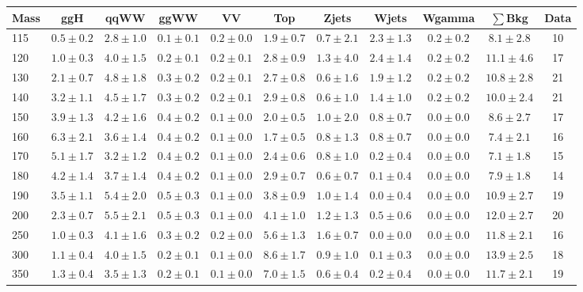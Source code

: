 \begin{table}
{\scriptsize
 \begin{center}
 \begin{tabular}{l c c c c c c c c c c }
 \hline
 Mass & ggH & qqWW & ggWW & VV & Top & Zjets & Wjets & Wgamma & $\sum$Bkg & Data \\
 \hline
115 & $0.5\pm0.2$ & $2.8\pm1.0$ & $0.1\pm0.1$ & $0.2\pm0.0$ & $1.9\pm0.7$ & $0.7\pm2.1$ & $2.3\pm1.3$ & $0.2\pm0.2$ & $8.1\pm2.8$ & 10 \\
120 & $1.0\pm0.3$ & $4.0\pm1.5$ & $0.2\pm0.1$ & $0.2\pm0.1$ & $2.8\pm0.9$ & $1.3\pm4.0$ & $2.4\pm1.4$ & $0.2\pm0.2$ & $11.1\pm4.6$ & 17 \\
130 & $2.1\pm0.7$ & $4.8\pm1.8$ & $0.3\pm0.2$ & $0.2\pm0.1$ & $2.7\pm0.8$ & $0.6\pm1.6$ & $1.9\pm1.2$ & $0.2\pm0.2$ & $10.8\pm2.8$ & 21 \\
140 & $3.2\pm1.1$ & $4.5\pm1.7$ & $0.3\pm0.2$ & $0.2\pm0.1$ & $2.9\pm0.8$ & $0.6\pm1.0$ & $1.4\pm1.0$ & $0.2\pm0.2$ & $10.0\pm2.4$ & 21 \\
150 & $3.9\pm1.3$ & $4.2\pm1.6$ & $0.4\pm0.2$ & $0.1\pm0.0$ & $2.0\pm0.5$ & $1.0\pm2.0$ & $0.8\pm0.7$ & $0.0\pm0.0$ & $8.6\pm2.7$ & 17 \\
160 & $6.3\pm2.1$ & $3.6\pm1.4$ & $0.4\pm0.2$ & $0.1\pm0.0$ & $1.7\pm0.5$ & $0.8\pm1.3$ & $0.8\pm0.7$ & $0.0\pm0.0$ & $7.4\pm2.1$ & 16 \\
170 & $5.1\pm1.7$ & $3.2\pm1.2$ & $0.4\pm0.2$ & $0.1\pm0.0$ & $2.4\pm0.6$ & $0.8\pm1.0$ & $0.2\pm0.4$ & $0.0\pm0.0$ & $7.1\pm1.8$ & 15 \\
180 & $4.2\pm1.4$ & $3.7\pm1.4$ & $0.4\pm0.2$ & $0.1\pm0.0$ & $2.9\pm0.7$ & $0.6\pm0.7$ & $0.1\pm0.4$ & $0.0\pm0.0$ & $7.9\pm1.8$ & 14 \\
190 & $3.5\pm1.1$ & $5.4\pm2.0$ & $0.5\pm0.3$ & $0.1\pm0.0$ & $3.8\pm0.9$ & $1.0\pm1.4$ & $0.0\pm0.4$ & $0.0\pm0.0$ & $10.9\pm2.7$ & 19 \\
200 & $2.3\pm0.7$ & $5.5\pm2.1$ & $0.5\pm0.3$ & $0.1\pm0.0$ & $4.1\pm1.0$ & $1.2\pm1.3$ & $0.5\pm0.6$ & $0.0\pm0.0$ & $12.0\pm2.7$ & 20 \\
250 & $1.0\pm0.3$ & $4.1\pm1.6$ & $0.3\pm0.2$ & $0.2\pm0.0$ & $5.6\pm1.3$ & $1.6\pm0.7$ & $0.0\pm0.0$ & $0.0\pm0.0$ & $11.8\pm2.1$ & 16 \\
300 & $1.1\pm0.4$ & $4.0\pm1.5$ & $0.2\pm0.1$ & $0.1\pm0.0$ & $8.6\pm1.7$ & $0.9\pm1.0$ & $0.1\pm0.3$ & $0.0\pm0.0$ & $13.9\pm2.5$ & 18 \\
350 & $1.3\pm0.4$ & $3.5\pm1.3$ & $0.2\pm0.1$ & $0.1\pm0.0$ & $7.0\pm1.5$ & $0.6\pm0.4$ & $0.2\pm0.4$ & $0.0\pm0.0$ & $11.7\pm2.1$ & 19 \\

\end{tabular}
\end{center}}
\end{table}

